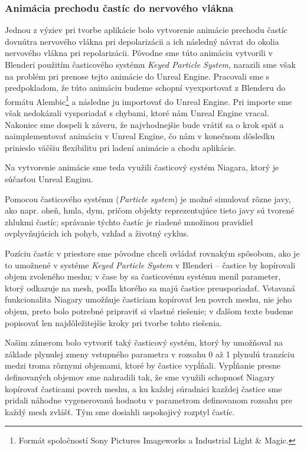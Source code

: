 \subsubsection{Animácia prechodu častíc do nervového vlákna}
Jednou z výziev pri tvorbe aplikácie bolo vytvorenie animácie prechodu častíc dovnútra nervového vlákna pri depolarizácii a ich následný návrat do okolia nervového vlákna pri repolarizácii. 
Pôvodne sme túto animáciu vytvorili v Blenderi použitím časticového systému \emph{Keyed Particle System}, narazili sme však na problém pri prenose tejto animácie do Unreal Engine. Pracovali sme s predpokladom, 
že túto animáciu budeme schopní vyexportovať z Blenderu do formátu Alembic\footnote{Formát spoločností Sony Pictures Imageworks a Industrial Light \& Magic.} a následne ju importovať do Unreal Engine. Pri importe sme však nedokázali vysporiadať s chybami, ktoré nám Unreal Engine vracal.
Nakoniec sme dospeli k záveru, že najvhodnejšie bude vrátiť sa o krok späť a naimplementovať animáciu v Unreal Engine, čo nám v konečnom dôsledku prinieslo väčšiu flexibilitu pri ladení animácie a chodu aplikácie.

Na vytvorenie animácie sme teda využili časticový systém Niagara, ktorý je súčasťou Unreal Enginu. 

Pomocou časticového systému (\emph{Particle system}) je možné simulovať rôzne javy, ako napr. oheň, hmla, dym, pričom objekty reprezentujúce tieto javy sú tvorené zhlukmi častíc; správanie týchto častíc
je riadené množinou pravidiel ovplyvňujúcich ich pohyb, vzhľad a životný cyklus.

Pozíciu častíc v priestore sme pôvodne chceli ovládať rovnakým spôsobom, ako je to umožnené v systéme \emph{Keyed Particle System} v Blenderi {--} častice by kopírovali objem zvoleného meshu; v čase by 
sa časticovému systému menil parameter, ktorý odkazuje na mesh, podľa ktorého sa majú častice preusporiadať. Vstavaná funkcionalita Niagary umožňuje časticiam kopírovať len povrch meshu, nie jeho objem, 
preto bolo potrebné pripraviť si vlastné riešenie; v ďalšom texte budeme popisovať len najdôležitejšie kroky pri tvorbe tohto riešenia. 

Našim zámerom bolo vytvoriť taký časticový systém, ktorý by umožňoval na základe plynulej zmeny vstupného parametra v rozsahu 0 až 1 plynulú tranzíciu medzi troma rôznymi objemami, ktoré by častice vypĺňali.
Vypĺňanie presne definovaných objemov sme nahradili tak, že sme využili schopnosť Niagary kopírovať časticami povrch meshu, a ku každej súradnici kazždej častice sme pridali náhodne vygenerovanú hodnotu v 
parametrom definovanom rozsahu pre každý mesh zvlášť. Tým sme dosiahli uspokojivý rozptyl častíc.

